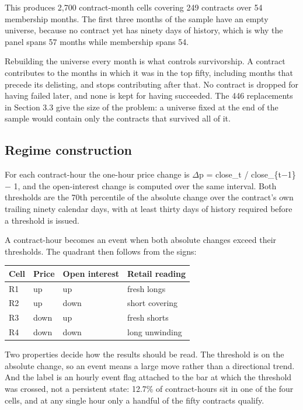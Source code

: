 \documentclass[11pt,a4paper]{article}
\begin{document}
This produces 2,700 contract-month cells covering 249 contracts over 54 membership months. The first three months of the sample have an empty universe, because no contract yet has ninety days of history, which is why the panel spans 57 months while membership spans 54.

Rebuilding the universe every month is what controls survivorship. A contract contributes to the months in which it was in the top fifty, including months that precede its delisting, and stops contributing after that. No contract is dropped for having failed later, and none is kept for having succeeded. The 446 replacements in Section 3.3 give the size of the problem: a universe fixed at the end of the sample would contain only the contracts that survived all of it.

\subsection{Regime construction}

For each contract-hour the one-hour price change is $\Delta$p = close\_t / close\_\{t$-$1\} $-$ 1, and the open-interest change is computed over the same interval. Both thresholds are the 70th percentile of the absolute change over the contract's own trailing ninety calendar days, with at least thirty days of history required before a threshold is issued.

A contract-hour becomes an event when both absolute changes exceed their thresholds. The quadrant then follows from the signs:

\begin{table}[H]\centering
\footnotesize
\begin{tabularx}{\linewidth}{>{\raggedright\arraybackslash}X>{\raggedright\arraybackslash}X>{\raggedright\arraybackslash}X>{\raggedright\arraybackslash}X}
\toprule
Cell & Price & Open interest & Retail reading \\
\midrule
R1 & up & up & fresh longs \\
R2 & up & down & short covering \\
R3 & down & up & fresh shorts \\
R4 & down & down & long unwinding \\
\bottomrule
\end{tabularx}
\end{table}

Two properties decide how the results should be read. The threshold is on the absolute change, so an event means a large move rather than a directional trend. And the label is an hourly event flag attached to the bar at which the threshold was crossed, not a persistent state: 12.7\% of contract-hours sit in one of the four cells, and at any single hour only a handful of the fifty contracts qualify.
\end{document}
